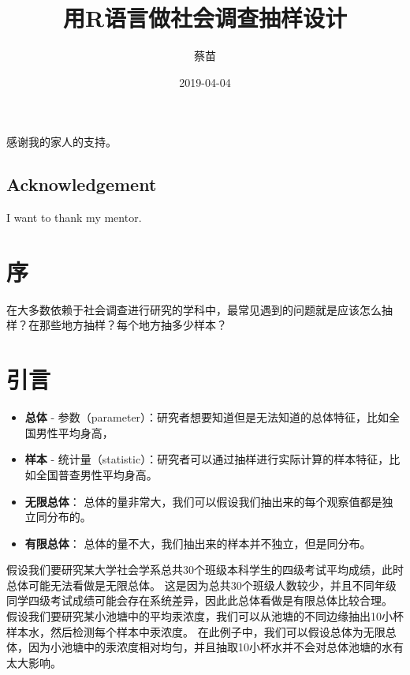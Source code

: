 \documentclass[]{ctexbook}
\title{用R语言做社会调查抽样设计}
\author{蔡苗}
\date{2019-04-04}
\newenvironment{dedication}
{
   \cleardoublepage
   \thispagestyle{empty}
   \vspace*{\stretch{1}}
   \hfill\begin{minipage}[t]{0.66\textwidth}
   \raggedright
}
{
   \end{minipage}
   \vspace*{\stretch{3}}
   \clearpage
}
\begin{document}
\maketitle

\begin{dedication}
感谢我的家人的支持。
\end{dedication}

\section*{Acknowledgement}

I want to thank my mentor.

{
\setcounter{tocdepth}{2}
\tableofcontents
}
\listoftables
\listoffigures

\mainmatter

\hypertarget{preface}{%
\chapter*{序}\label{preface}}


在大多数依赖于社会调查进行研究的学科中，最常见遇到的问题就是应该怎么抽样？在那些地方抽样？每个地方抽多少样本？

\hypertarget{section}{%
\chapter{引言}\label{section}}

\begin{itemize}
\item
  \textbf{总体} - 参数（parameter）：研究者想要知道但是无法知道的总体特征，比如全国男性平均身高，
\item
  \textbf{样本} - 统计量（statistic）：研究者可以通过抽样进行实际计算的样本特征，比如全国普查男性平均身高。
\item
  \textbf{无限总体}： 总体的量非常大，我们可以假设我们抽出来的每个观察值都是独立同分布的。
\item
  \textbf{有限总体}： 总体的量不大，我们抽出来的样本并不独立，但是同分布。
\end{itemize}

假设我们要研究某大学社会学系总共30个班级本科学生的四级考试平均成绩，此时总体可能无法看做是无限总体。
这是因为总共30个班级人数较少，并且不同年级同学四级考试成绩可能会存在系统差异，因此此总体看做是有限总体比较合理。
假设我们要研究某小池塘中的平均汞浓度，我们可以从池塘的不同边缘抽出10小杯样本水，然后检测每个样本中汞浓度。
在此例子中，我们可以假设总体为无限总体，因为小池塘中的汞浓度相对均匀，并且抽取10小杯水并不会对总体池塘的水有太大影响。
\end{document}
